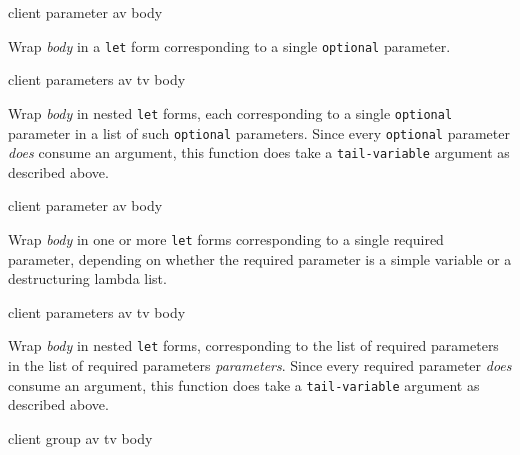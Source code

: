  {client parameter av body}

Wrap \textit{body} in a \texttt{let} form corresponding to a single
\texttt{optional} parameter.

 {client parameters av tv body}

Wrap \textit{body} in nested \texttt{let} forms, each corresponding to
a single \texttt{optional} parameter in a list of such
\texttt{optional} parameters.  Since every \texttt{optional} parameter
\textit{does} consume an argument, this function does take a
\texttt{tail-variable} argument as described above.

 {client parameter av body}

Wrap \textit{body} in one or more \texttt{let} forms corresponding to
a single required parameter, depending on whether the required
parameter is a simple variable or a destructuring lambda list.

 {client parameters av tv body}

Wrap \textit{body} in nested \texttt{let} forms, corresponding to the
list of required parameters in the list of required parameters
\textit{parameters}.  Since every required parameter \textit{does}
consume an argument, this function does take a \texttt{tail-variable}
argument as described above.

 {client group av tv body}

